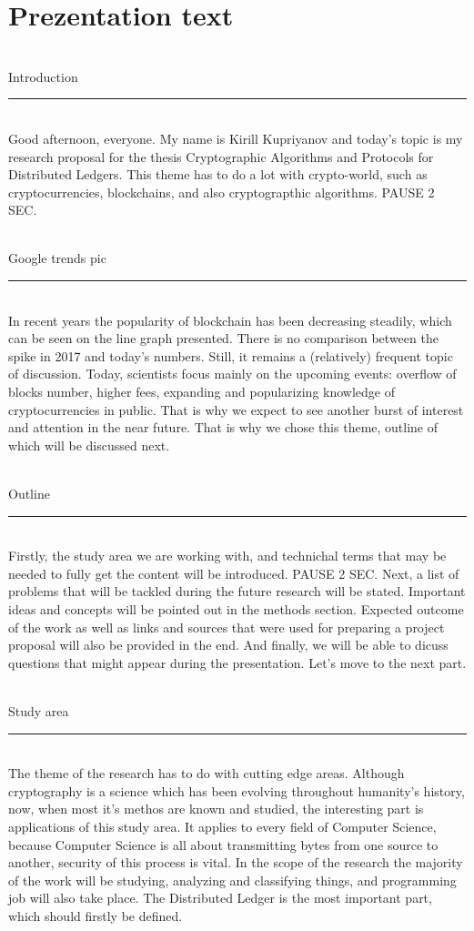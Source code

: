 \documentclass[12pt]{article}
\renewcommand{\line}[1]{\noindent\\{#1}\vspace{-0.42cm}\\\rule{\textwidth}{1pt}\\}
\begin{document}
\section*{Prezentation text}

\line{Introduction}
Good afternoon, everyone. My name is Kirill Kupriyanov and today's topic is
my research proposal for the thesis Cryptographic Algorithms and Protocols for
Distributed Ledgers. This theme has to do a lot with crypto-world, such as
cryptocurrencies, blockchains, and also cryptograpthic algorithms. PAUSE 2 SEC.

\line{Google trends pic}
In recent years the popularity of blockchain has been decreasing steadily,
which can be seen on the line graph presented. There is no comparison between
the spike in 2017 and today's numbers. Still, it remains a (relatively)
frequent topic of discussion. Today, scientists focus mainly on the upcoming
events: overflow of blocks number, higher fees, expanding and popularizing
knowledge of cryptocurrencies in public. That is why we expect to see another
burst of interest and attention in the near future.
That is why we chose this theme, outline of which will be discussed next.


\line{Outline}
Firstly, the study area we are working with, and technichal terms that may be
needed to fully get the content will be introduced. PAUSE 2 SEC.  Next, a list
of problems that will be tackled during the future research will be stated.
Important ideas and concepts will be pointed out in the methods section.
Expected outcome of the work as well as links and sources that were used for
preparing a project proposal will also be provided in the end. And finally, we
will be able to dicuss questions that might appear during the presentation.
Let's move to the next part.

\line{Study area}
The theme of the research has to do with cutting edge areas. Although
cryptography is a science which has been evolving throughout humanity's
history, now, when most it's methos are known and studied, the interesting part
is applications of this study area. It applies to every field of Computer
Science, because Computer Science is all about transmitting bytes from one
source to another, security of this process is vital. In the scope of the
research the majority of the work will be studying, analyzing and classifying
things, and programming job will also take place. The Distributed Ledger is the
most important part, which should firstly be defined.

\end{document}
